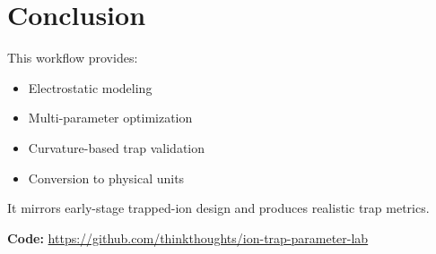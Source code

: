 \documentclass[11pt]{article}
\begin{document}
\section*{Conclusion}

This workflow provides:

\begin{itemize}
\item Electrostatic modeling
\item Multi-parameter optimization
\item Curvature-based trap validation
\item Conversion to physical units
\end{itemize}

It mirrors early-stage trapped-ion design and produces realistic trap metrics.

\vspace{0.5em}
\noindent
\textbf{Code:} \url{https://github.com/thinkthoughts/ion-trap-parameter-lab}
\end{document}
